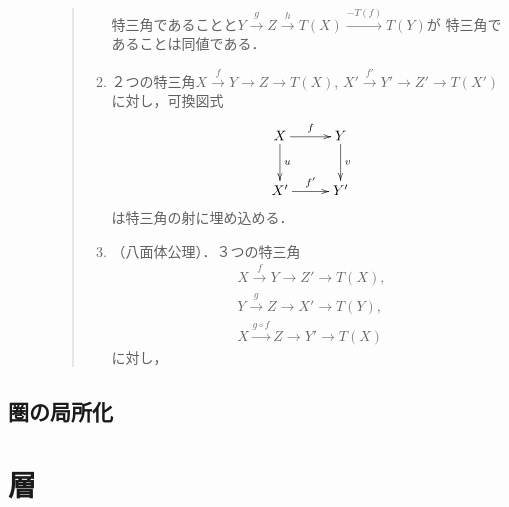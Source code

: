 \begin{Definition}
\begin{description}
\begin{quote}
\begin{enumerate}
                    特三角であることと$Y\overset{g}{\longrightarrow}
                    Z\overset{h}{\longrightarrow} T(X)\overset{-T(f)}{\longrightarrow} T(Y)$が
                    特三角であることは同値である．\label{TR3}
                \item ２つの特三角$X\overset{f}{\to}
                Y\to Z\to T(X)$, $X'\overset{f'}{\to}
                Y'\to Z'\to T(X')$に対し，可換図式
                \begin{equation*}
                    \vcenter{\xymatrix
                    @C=26pt@R=26pt
                    {
                    X\ar[r]^-{f}\ar[d]^-{u}
                    &
                    Y\ar[d]^-{v} 
                    \\
                    X'\ar[r]^-{f'}
                    &
                    Y'
                    }}
                \end{equation*}
                は特三角の射に埋め込める．\label{TR4}
                \item（八面体公理）．３つの特三角
                \begin{align*}
                    X\overset{f}{\to}Y\to Z'\to T(X), \\
                    Y\overset{g}{\to}Z\to X'\to T(Y),\\
                    X\overset{g\circ f}{\longrightarrow}
                    Z\to Y'\to T(X)
                \end{align*}
                に対し， \label{TR5}
            \end{enumerate}    
        \end{quote}
    \end{description}
\end{Definition}

\section{圏の局所化}



\clearpage
\chapter{層}

